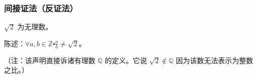 \subsubsection*{间接证法（反证法）}

\begin{center}
    \noindent {}
\end{center}

\begin{example}
    $\sqrt{2} $ 为无理数。
    \begin{center}
        陈述：$ \forall a, b \in \mathbb{Z} \centerdot \frac{a}{b} \ne \sqrt{2}$。
    \end{center}
    （注：该声明直接诉诸有理数 $\mathbb{Q}$ 的定义。它说 $\sqrt{2} \notin \mathbb{Q}$ 因为该数无法表示为整数之比。）
\end{example}

